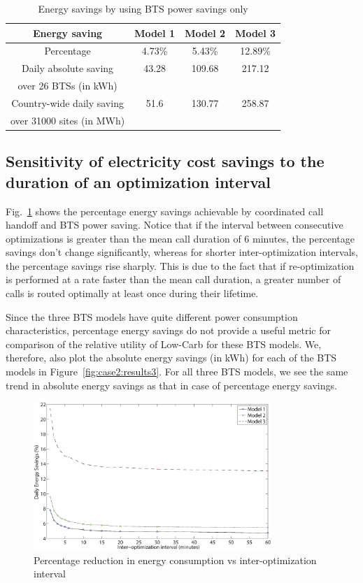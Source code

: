 \begin{table}
\centering
\begin{tabular}{|c|c|c|c|}
\hline Energy saving & Model 1 & Model 2 & Model 3 \\
\hline Percentage & 4.73\% & 5.43\% & 12.89\% \\
\hline Daily absolute saving & 43.28 & 109.68 & 217.12 \\
over 26 BTSs (in kWh) & \ & \ & \ \\
\hline Country-wide daily saving & 51.6 & 130.77 & 258.87\\
over 31000 sites (in MWh) & \ & \ & \ \\
\hline
\end{tabular}
\caption{Energy savings by using BTS power savings only}
\label{tab:psonly}
\end{table}

\subsection{Sensitivity of electricity cost savings to the duration of an optimization interval} Fig.~\ref{fig:case2:results2} shows the percentage energy savings achievable by coordinated call handoff and BTS power saving. Notice that if the interval between consecutive optimizations is greater than the mean call duration of 6 minutes, the percentage savings don't change significantly, whereas for shorter inter-optimization intervals, the percentage savings rise sharply. This is due to the fact that if re-optimization is performed at a rate faster than the mean call duration, a greater number of calls is routed optimally at least once during their lifetime. 

Since the three BTS models have quite different power consumption characteristics, percentage energy savings do not provide a useful metric for comparison of the relative utility of Low-Carb for these BTS models. We, therefore, also plot the absolute energy savings (in kWh) for each of the BTS models in Figure~\ref{fig:case2:results3}. For all three BTS models, we see the same trend in absolute energy savings as that in case of percentage energy savings. 

\begin{figure}
\centering
\includegraphics[width=0.8\textwidth]{pics/perc.savings.red-bl-bw.eps}
\caption{Percentage reduction in energy consumption vs inter-optimization interval}
\label{fig:case2:results2}
\end{figure}

